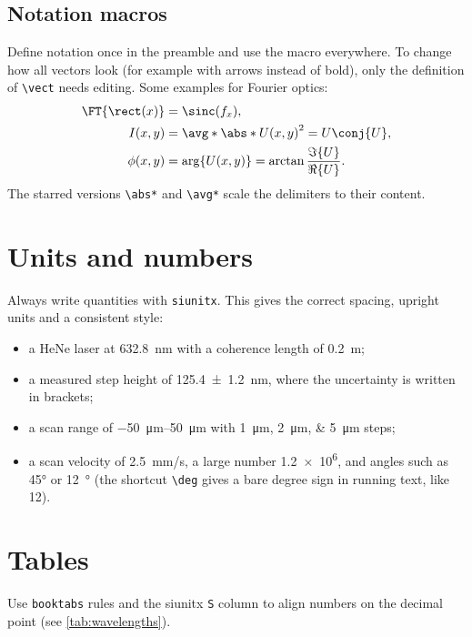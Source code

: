 \subsection{Notation macros}

Define notation once in the preamble and use the macro everywhere. To change how all vectors look (for example with arrows instead of bold), only the definition of \texttt{\textbackslash vect} needs editing. Some examples for Fourier optics:
\begin{align}
    \FT\{\rect(x)\}      &= \sinc(f_x), \\
    I(x, y)              &= \avg*{\abs*{U(x, y)}^2} = U \conj{U}, \\
    \phi(x, y)           &= \arg\{U(x, y)\} = \arctan\frac{\Im\{U\}}{\Re\{U\}}.
\end{align}
The starred versions \texttt{\textbackslash abs*} and \texttt{\textbackslash avg*} scale the delimiters to their content.

\section{Units and numbers}
\label{sec:units}

Always write quantities with \texttt{siunitx}. This gives the correct spacing, upright units and a consistent style:
\begin{itemize}
    \item a HeNe laser at \qty{632.8}{nm} with a coherence length of \qty{0.2}{m};
    \item a measured step height of \qty{125.4(12)}{nm}, where the uncertainty is written in brackets;
    \item a scan range of \qtyrange{-50}{50}{\micro m} with \qtylist{1;2;5}{\micro m} steps;
    \item a scan velocity of \qty{2.5}{mm/s}, a large number \num{1.2e6}, and angles such as \ang{45} or \qty{12}{\degree} (the shortcut \texttt{\textbackslash deg} gives a bare degree sign in running text, like 12\deg).
\end{itemize}

\section{Tables}
\label{sec:tables}

Use \texttt{booktabs} rules and the siunitx \texttt{S} column to align numbers on the decimal point (see \cref{tab:wavelengths}).

